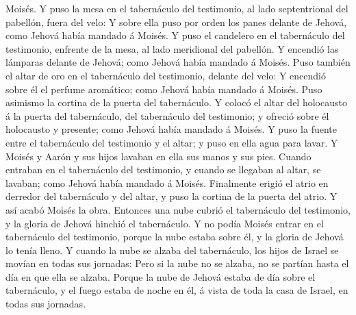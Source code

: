 Moisés.  Y puso la mesa en el tabernáculo del testimonio,
al lado septentrional del pabellón, fuera del velo:  Y
sobre ella puso por orden los panes delante de Jehová, como Jehová había
mandado á Moisés.  Y puso el candelero en el tabernáculo
del testimonio, enfrente de la mesa, al lado meridional del pabellón.
 Y encendió las lámparas delante de Jehová; como Jehová
había mandado á Moisés.  Puso también el altar de oro en
el tabernáculo del testimonio, delante del velo:  Y
encendió sobre él el perfume aromático; como Jehová había mandado á
Moisés.  Puso asimismo la cortina de la puerta del
tabernáculo.  Y colocó el altar del holocausto á la
puerta del tabernáculo, del tabernáculo del testimonio; y ofreció sobre
él holocausto y presente; como Jehová había mandado á Moisés.
 Y puso la fuente entre el tabernáculo del testimonio y
el altar; y puso en ella agua para lavar.  Y Moisés y
Aarón y sus hijos lavaban en ella sus manos y sus pies. 
Cuando entraban en el tabernáculo del testimonio, y cuando se llegaban
al altar, se lavaban; como Jehová había mandado á Moisés.
 Finalmente erigió el atrio en derredor del tabernáculo y
del altar, y puso la cortina de la puerta del atrio. Y así acabó Moisés
la obra.  Entonces una nube cubrió el tabernáculo del
testimonio, y la gloria de Jehová hinchió el tabernáculo.
 Y no podía Moisés entrar en el tabernáculo del
testimonio, porque la nube estaba sobre él, y la gloria de Jehová lo
tenía lleno.  Y cuando la nube se alzaba del tabernáculo,
los hijos de Israel se movían en todas sus jornadas: 
Pero si la nube no se alzaba, no se partían hasta el día en que ella se
alzaba.  Porque la nube de Jehová estaba de día sobre el
tabernáculo, y el fuego estaba de noche en él, á vista de toda la casa
de Israel, en todas sus jornadas.
